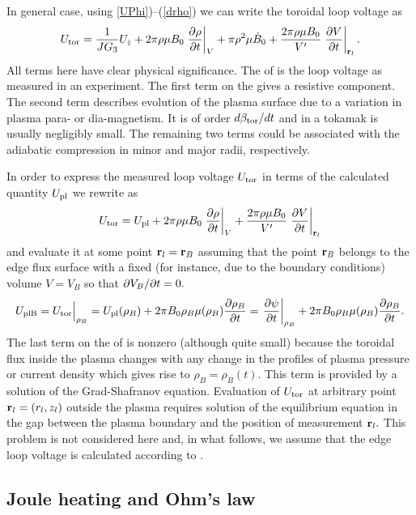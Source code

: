 In general case, using \eqs\ref{UPhi})--(\ref{drho}) we can write the
toroidal loop voltage as 
\begin{equation}\label{Utor1}
U_{\rm tor}
=\frac{1}{JG_3}U_{\scriptscriptstyle\parallel}
+2\pi \rho\mu B_0\left.\displaystyle{\partial \rho\over\partial t}\right|_V
+\pi\rho^2 \mu\dot B_0
+\frac{2\pi \rho\mu B_0}{V'}\left.\displaystyle{\partial V\over\partial t}\right|_{{\bf r}_l}
.\end{equation}
All terms here have clear physical significance. 
The \lhs  of  is the loop voltage as measured in an experiment.
The first term on the \rhs gives a resistive component. 
The second term describes evolution of the plasma surface due to a
variation in plasma para- or dia-magnetism. 
It is of order $d\beta_{\rm tor}/dt$ and in a tokamak is usually
negligibly small. 
The remaining two terms could be associated with the adiabatic compression
in minor and major radii, respectively. 

In order to express the measured loop voltage $U_{\rm tor}$ in terms of
the calculated quantity $U_{\rm pl}$ we rewrite  as
\begin{equation}\label{Utor}
U_{\rm tor}
=U_{\rm pl}
+2\pi \rho\mu B_0\left.\displaystyle{\partial \rho\over\partial t}\right|_V
+\frac{2\pi \rho\mu B_0}{V'}\left.\displaystyle{\partial V\over\partial t}\right|_{{\bf r}_l}
\end{equation}
and evaluate it at some point ${\bf r}_l={\bf r}_B$ assuming that the point
${\bf r}_B$ belongs to the edge flux surface with a fixed (for instance, 
due to the boundary conditions) volume $V=V_B$ so that 
$\partial V_B/\partial t=0.$ 
\begin{equation}\label{Uplb}
U_{\rm plB}
=U_{\rm tor}\Bigr|_{\rho_B}
=U_{\rm pl}(\rho_B)
+2\pi B_0\rho_B\mu(\rho_B)\displaystyle{\partial \rho_B\over\partial t}
=\left.\displaystyle{\partial \psi\over\partial t}\right|_{\rho_B}
+2\pi B_0\rho_B\mu(\rho_B)\displaystyle{\partial \rho_B\over\partial t}
.\end{equation}
The last term on the \rhs of  is nonzero (although quite small)
because the toroidal flux inside the plasma changes with any change in
the profiles of plasma pressure or current density which gives rise to
$\rho_B=\rho_B(t).$ 
This term is provided by a solution of the Grad-Shafranov equation.
Evaluation of $U_{\rm tor}$ at arbitrary point ${\bf r}_l=(r_l,z_l)$ outside
the plasma requires solution of the equilibrium equation in the gap
between the plasma boundary and the position of measurement ${\bf r}_l.$ 
This problem is not considered here and, in what follows, we assume that
the edge loop voltage is calculated according to .

\subsection{Joule heating and Ohm's law}


